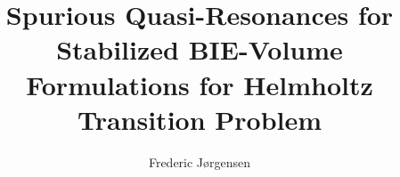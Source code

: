 \documentclass[10pt,journal,compsoc, onecolumn]{IEEEtran}
\begin{document}
\title{Spurious Quasi-Resonances for Stabilized BIE-Volume Formulations for Helmholtz Transition Problem}

\author{Frederic Jørgensen}









\maketitle

\IEEEdisplaynontitleabstractindextext
\IEEEpeerreviewmaketitle
\end{document}
